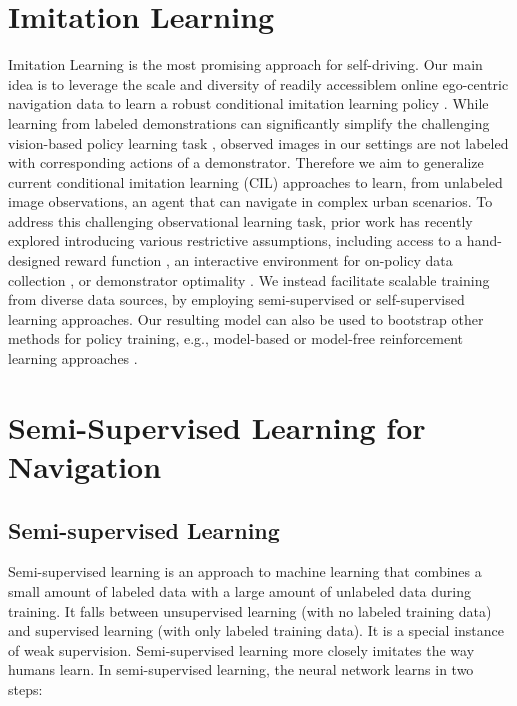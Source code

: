 \documentclass[letterpaper, 12pt]{book}
\theoremstyle{definition}
\theoremstyle{definition}
\theoremstyle{definition}
\theoremstyle{definition}
\theoremstyle{definition}
\begin{document}
\section{Imitation Learning}
\label{sec:org516091b}
Imitation Learning is the most promising approach for self-driving. Our main
idea is to leverage the scale and diversity of readily accessiblem online
ego-centric navigation data to learn a robust conditional imitation learning
policy \cite{Chen2019,Codevilla2017}. While learning from labeled demonstrations
can significantly simplify the challenging vision-based policy learning task
\cite{article,Bojarski2016,7410669,chen2021learning,Gupta2017,Hawke2019,Li2018,Liang2018,Mueller2018,inproceedings,Osa2018,Pomerleau1988,Prakash2021,Zhang2021,DBLP:journals/corr/abs-1912-02973,Zhou2019a},
observed images in our settings are not labeled with corresponding actions of a
demonstrator. Therefore we aim to generalize current conditional imitation
learning (CIL) approaches \cite{Chen2019,Codevilla2017,Codevilla2019} to learn,
from unlabeled image observations, an agent that can navigate in complex urban
scenarios. To address this challenging observational learning task, prior work
has recently explored introducing various restrictive assumptions, including
access to a hand-designed reward function \cite{Chang2020}, an interactive
environment for on-policy data collection \cite{torabi2018}, or demonstrator
optimality \cite{torabi2018,Torabi2019}. We instead facilitate scalable training
from diverse data sources, by employing semi-supervised or self-supervised
learning approaches. Our resulting model can also be used to bootstrap other
methods for policy training, e.g., model-based or model-free reinforcement
learning approaches \cite{chen2021learning,Liang2018,9157137,Toromanoff2019}.

\section{Semi-Supervised Learning for Navigation \label{orga011b81}}
\label{sec:orgd477d17}

\subsection{Semi-supervised Learning}
\label{sec:orga132c46}
Semi-supervised learning is an approach to machine learning that combines a
small amount of labeled data with a large amount of unlabeled data during
training. It falls between unsupervised learning (with no labeled training data)
and supervised learning (with only labeled training data). It is a special
instance of weak supervision. Semi-supervised learning more closely imitates the
way humans learn. In semi-supervised learning, the neural network learns in two
steps:
\end{document}
